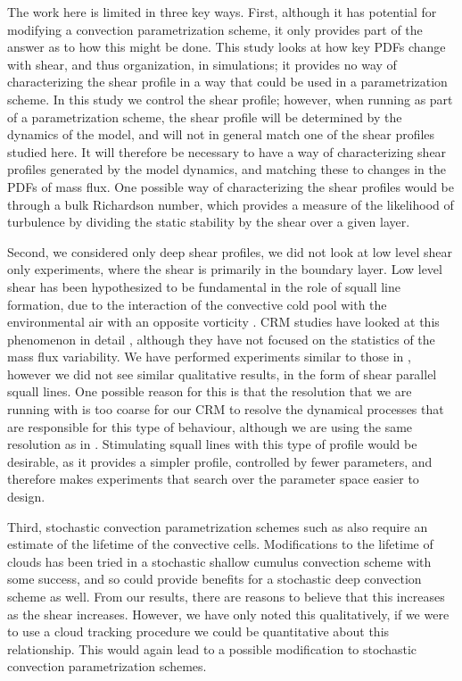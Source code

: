 \documentclass[11pt,a4paper]{article}
\begin{document}
The work here is limited in three key ways. First, although it has potential for modifying a convection parametrization scheme, it only provides part of the answer as to how this might be done. This study looks at how key PDFs change with shear, and thus organization, in simulations; it provides no way of characterizing the shear profile in a way that could be used in a parametrization scheme. In this study we control the shear profile; however, when running as part of a parametrization scheme, the shear profile will be determined by the dynamics of the model, and will not in general match one of the shear profiles studied here. It will therefore be necessary to have a way of characterizing shear profiles generated by the model dynamics, and matching these to changes in the PDFs of mass flux. One possible way of characterizing the shear profiles would be through a bulk Richardson number, which provides a measure of the likelihood of turbulence by dividing the static stability by the shear over a given layer.

Second, we considered only deep shear profiles, we did not look at low level shear only experiments, where the shear is primarily in the boundary layer. Low level shear has been hypothesized to be fundamental in the role of squall line formation, due to the interaction of the convective cold pool with the environmental air with an opposite vorticity \parencite{RKW1988}. CRM studies have looked at this phenomenon in detail \parencite{RE2001, TMM1982}, although they have not focused on the statistics of the mass flux variability. We have performed experiments similar to those in \cite{RE2001}, however we did not see similar qualitative results, in the form of shear parallel squall lines. One possible reason for this is that the resolution that we are running with is too coarse for our CRM to resolve the dynamical processes that are responsible for this type of behaviour, although we are using the same resolution as in \cite{RE2001}. Stimulating squall lines with this type of profile would be desirable, as it provides a simpler profile, controlled by fewer parameters, and therefore makes experiments that search over the parameter space easier to design.

Third, stochastic convection parametrization schemes such as \cite{PC2008} also require an estimate of the lifetime of the convective cells. Modifications to the lifetime of clouds has been tried in a stochastic shallow cumulus convection scheme \parencite{sakradzija2016stochastic} with some success, and so could provide benefits for a stochastic deep convection scheme as well. From our results, there are reasons to believe that this increases as the shear increases. However, we have only noted this qualitatively, if we were to use a cloud tracking procedure we could be quantitative about this relationship. This would again lead to a possible modification to stochastic convection parametrization schemes.
\end{document}
